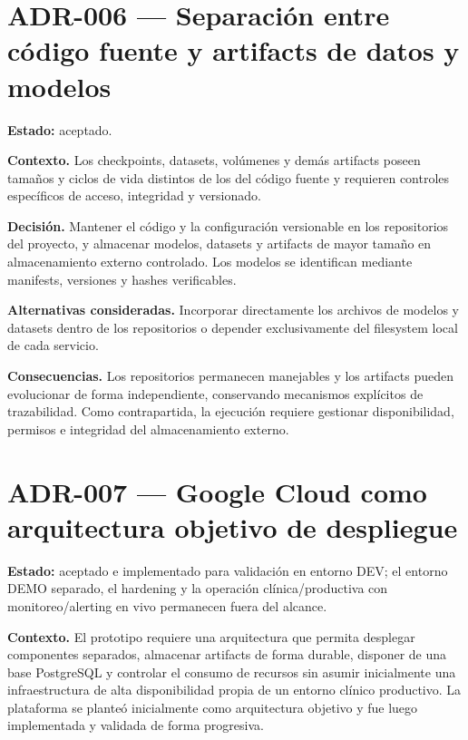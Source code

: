\section*{ADR-006 --- Separación entre código fuente y artifacts de datos y modelos}
{}
\label{adr:006-separacion-codigo-artifacts}

\textbf{Estado:} aceptado.

\textbf{Contexto.} Los checkpoints, datasets, volúmenes y demás artifacts poseen tamaños y ciclos de vida distintos de los del código fuente y requieren controles específicos de acceso, integridad y versionado.

\textbf{Decisión.} Mantener el código y la configuración versionable en los repositorios del proyecto, y almacenar modelos, datasets y artifacts de mayor tamaño en almacenamiento externo controlado. Los modelos se identifican mediante manifests, versiones y hashes verificables.

\textbf{Alternativas consideradas.} Incorporar directamente los archivos de modelos y datasets dentro de los repositorios o depender exclusivamente del filesystem local de cada servicio.

\textbf{Consecuencias.} Los repositorios permanecen manejables y los artifacts pueden evolucionar de forma independiente, conservando mecanismos explícitos de trazabilidad. Como contrapartida, la ejecución requiere gestionar disponibilidad, permisos e integridad del almacenamiento externo.

\section*{ADR-007 --- Google Cloud como arquitectura objetivo de despliegue}
{}
\label{adr:007-google-cloud-despliegue}

\textbf{Estado:} aceptado e implementado para validación en entorno DEV; el entorno DEMO separado, el hardening y la operación clínica/productiva con monitoreo/alerting en vivo permanecen fuera del alcance.

\textbf{Contexto.} El prototipo requiere una arquitectura que permita desplegar componentes separados, almacenar artifacts de forma durable, disponer de una base PostgreSQL y controlar el consumo de recursos sin asumir inicialmente una infraestructura de alta disponibilidad propia de un entorno clínico productivo. La plataforma se planteó inicialmente como arquitectura objetivo y fue luego implementada y validada de forma progresiva.

